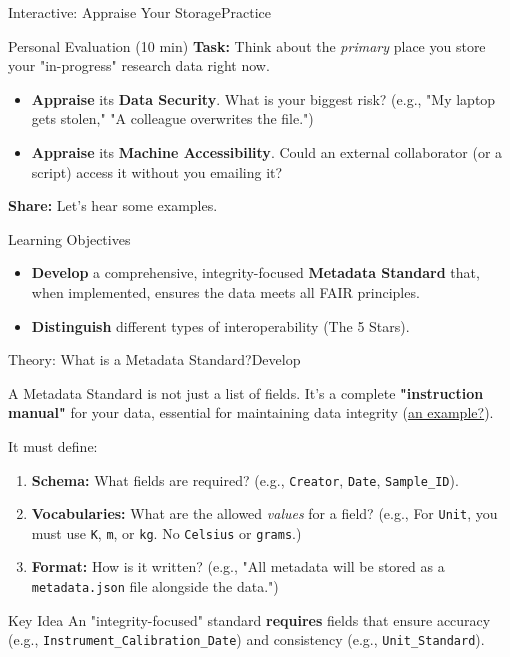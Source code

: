 \begin{frame}{Interactive: Appraise Your Storage}{Practice}
    \begin{block}{Personal Evaluation (10 min)}
        \textbf{Task:} Think about the \emph{primary} place you store your "in-progress" research data right now.
        \begin{itemize}
            \item \textbf{Appraise} its \textbf{Data Security}. What is your biggest risk? (e.g., "My laptop gets stolen," "A colleague overwrites the file.")
            \pause
            \item \textbf{Appraise} its \textbf{Machine Accessibility}. Could an external collaborator (or a script) access it without you emailing it?
        \end{itemize}
        \pause
        \textbf{Share:} Let's hear some examples.
    \end{block}
\end{frame}

\begin{frame}{Learning Objectives}
    \begin{itemize}
        \item \textbf{Develop} a comprehensive, integrity-focused \textbf{Metadata Standard} that, when implemented, ensures the data meets all FAIR principles.
        \item \textbf{Distinguish} different types of interoperability (The 5 Stars).
    \end{itemize}
\end{frame}

\begin{frame}{Theory: What is a Metadata Standard?}{Develop}

    A Metadata Standard is not just a list of fields. It's a complete \textbf{"instruction manual"} for your data, essential for maintaining data integrity (\href{https://github.com/OpenEnergyPlatform/oemetadata}{an example?}).

    It must define:
    \begin{enumerate}
        \pause
        \item \textbf{Schema:} What fields are required? (e.g., \texttt{Creator}, \texttt{Date}, \texttt{Sample\_ID}).
        \pause
        \item \textbf{Vocabularies:} What are the allowed \textit{values} for a field? (e.g., For \texttt{Unit}, you must use \texttt{K}, \texttt{m}, or \texttt{kg}. No \texttt{Celsius} or \texttt{grams}.)
        \pause
        \item \textbf{Format:} How is it written? (e.g., "All metadata will be stored as a \texttt{metadata.json} file alongside the data.")
    \end{enumerate}
    \pause
    \begin{block}{Key Idea}
        An "integrity-focused" standard \textbf{requires} fields that ensure accuracy (e.g., \texttt{Instrument\_Calibration\_Date}) and consistency (e.g., \texttt{Unit\_Standard}).
    \end{block}
\end{frame}

